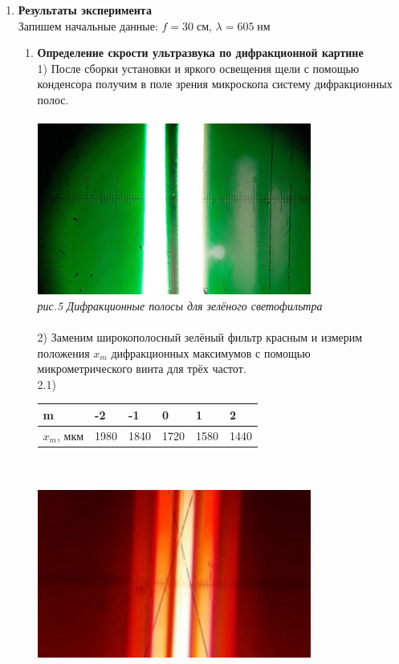\documentclass[a4paper]{article}
\begin{document}
\begin{multicols}{2}
\begin{enumerate}
\item \textbf{Результаты эксперимента}\\
Запишем начальные данные: $f = 30 \; \textit{см}$, $\lambda = 605 \; \textit{нм}$
\begin{enumerate}
\item \textbf{Определение скрости ультразвука по дифракционной картине}\\
1) После сборки установки и яркого освещения щели с помощью конденсора получим в поле зрения микроскопа систему дифракционных полос.\\
\\
\includegraphics[width=9cm]{exp4}\\
\textit{рис.5 Дифракционные полосы для зелёного светофильтра}\\
\\
2) Заменим широкополосный зелёный фильтр красным и измерим положения $x_m$ дифракционных максимумов с помощью микрометрического винта для трёх частот.\\
2.1) \begin{tabular}{|l|l|l|l|l|l|}
\hline
m & -2 & -1 & 0 & 1 & 2\\
\hline
$x_m$, мкм & 1980 & 1840 & 1720 & 1580 & 1440\\
\hline
\end{tabular}\\
\\
\includegraphics[width=9cm]{exp5}\\

\end{enumerate}
\end{enumerate}
\end{multicols}
\end{document}
